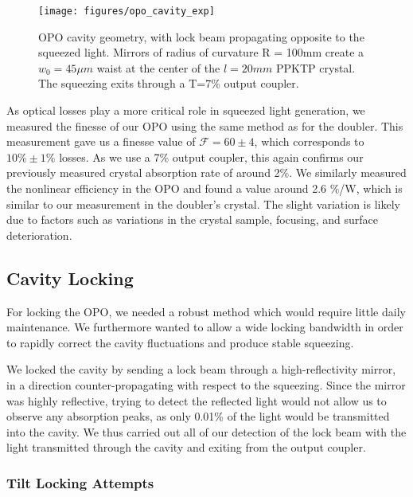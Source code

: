 \begin{figure}[!ht] 
 \centering 
 \texttt{[image: figures/opo\_cavity\_exp]} 
 \caption[OPO cavity geometry]{OPO cavity geometry, with lock beam propagating opposite to the squeezed light.  Mirrors of radius of curvature R = 100mm create a $w_0 = 45 \mu m$ waist at the center of the $l = 20mm$ PPKTP crystal.  The squeezing exits through a T=7\% output coupler.} 
 \label{fig:opo_cavity} 
\end{figure} 

As optical losses play a more critical role in squeezed light generation, we measured the finesse of our OPO using the same method as for the doubler.  This measurement gave us a finesse value of $\mathcal{F} = 60 \pm 4$, which corresponds to $10\% \pm 1\%$ losses.  As we use a 7\% output coupler, this again confirms our previously measured crystal absorption rate of around 2\%.  We similarly measured the nonlinear efficiency in the OPO and found a value around 2.6 \%/W, which is similar to our measurement in the doubler's crystal. The slight variation is likely due to factors such as variations in the crystal sample, focusing, and surface deterioration.  



\subsection{Cavity Locking} 
\label{cavity_locking} 
For locking the OPO, we needed a robust method which would require little daily maintenance.  We furthermore wanted to allow a wide locking bandwidth in order to rapidly correct the cavity fluctuations and produce stable squeezing.  

We locked the cavity by sending a lock beam through a high-reflectivity mirror, in a direction counter-propagating with respect to the squeezing.  Since the mirror was highly reflective, trying to detect the reflected light would not allow us to observe any absorption peaks, as only 0.01\% of the light would be transmitted into the cavity.  We thus carried out all of our detection of the lock beam with the light transmitted through the cavity and exiting from the output coupler.


\subsubsection{Tilt Locking Attempts}
\label{tilt_locking_attempts} 

